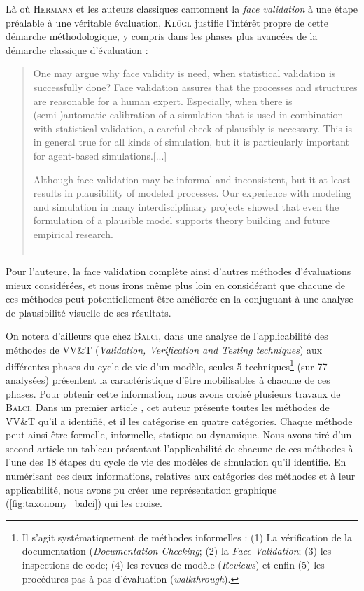 Là où H\textsc{ermann} et les auteurs classiques cantonnent la \textit{face validation} à une étape préalable à une véritable évaluation, K\textsc{lügl} justifie l'intérêt propre de cette démarche méthodologique, y compris dans les phases plus avancées de la démarche classique d'évaluation :

\begin{quotation}
	\noindent \og One may argue why face validity is need, when statistical validation is successfully done?
	Face validation assures that the processes and structures are reasonable for a human expert.
	Especially, when there is (semi-)automatic calibration of a simulation that is used in combination with statistical validation, a careful check of plausibly is necessary.
	This is in general true for all kinds of simulation, but it is particularly important for agent-based simulations.[...]
	
	\noindent Although face validation may be informal and inconsistent, but it at least results in plausibility of modeled processes.
	Our experience with modeling and simulation in many interdisciplinary projects showed that even the formulation of a plausible model supports theory building and future empirical research.\fg{}\\
	\mbox{}~ \hfill \textcite[40;43]{klugl_validation_2008}
\end{quotation}


Pour l'auteure, la face validation complète ainsi d'autres méthodes d'évaluations mieux considérées, et nous irons même plus loin en considérant que chacune de ces méthodes peut potentiellement être améliorée en la conjuguant à une analyse de plausibilité visuelle de ses résultats.

On notera d'ailleurs que chez B\textsc{alci}, dans une analyse de l'applicabilité des méthodes de \og VV\&T\fg{} (\textit{Validation, Verification and Testing techniques}) aux différentes phases du cycle de vie d'un modèle, seules 5 techniques\footnote{
	Il s'agit systématiquement de méthodes \og informelles\fg{} : 
	(1) La vérification de la documentation (\textit{Documentation Checking}; (2) la \textit{Face Validation}; (3) les inspections de code; (4) les \og revues\fg{} de modèle (\textit{Reviews}) et enfin (5) les \og procédures pas à pas\fg{} d'évaluation (\textit{walkthrough}).
} (sur 77 analysées) présentent la caractéristique d'être mobilisables à chacune de ces phases.
Pour obtenir cette information, nous avons croisé plusieurs travaux de \textsc{Balci}.
Dans un premier article \autocite{balci_verification_1997}, cet auteur présente toutes les méthodes de VV\&T qu'il a identifié, et il les catégorise en quatre catégories.
Chaque méthode peut ainsi être formelle, informelle, statique ou dynamique.
Nous avons tiré d'un second article \autocite{balci1998verification} un tableau présentant l'applicabilité de chacune de ces méthodes à l'une des 18 étapes du \og cycle de vie\fg{} des modèles de simulation qu'il identifie.
En numérisant ces deux informations, relatives aux catégories des méthodes et à leur applicabilité, nous avons pu créer une représentation graphique (\cref{fig:taxonomy_balci}) qui les croise.

